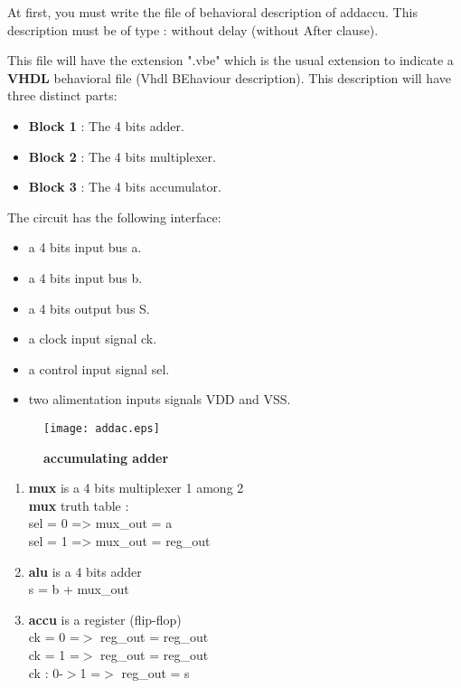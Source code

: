 \documentclass[12pt]{article}
\begin{document}
{At first, you must write the file of behavioral description of addaccu.
This description must be of type : without delay (without After clause).

This file will have the extension ".vbe" which is the usual extension
to indicate a {\bf VHDL} behavioral file (Vhdl BEhaviour description).
This description will have three distinct parts:

\begin{itemize}\itemsep=-.8ex
\item {\bf Block 1} : The 4 bits adder.
\item {\bf Block 2} : The 4 bits multiplexer.
\item {\bf Block 3} : The 4 bits accumulator.
\end{itemize}

The circuit has the following interface:

\begin{itemize}\itemsep=-.8ex
\item  a 4 bits input bus a.
\item  a 4 bits input bus b.
\item  a 4 bits output bus S.
\item  a clock input signal ck.
\item  a control input signal sel.
\item  two alimentation inputs signals VDD and VSS.
\end{itemize}


\begin{figure}[H]
  \center
  \texttt{[image: addac.eps]}
  \caption{\bf accumulating adder }
\end{figure}

\begin{enumerate}
\item {\bf mux } is a 4 bits multiplexer 1 among 2\\
    {\bf mux} truth table : \\
    sel = 0 => mux\_out = a \\
    sel = 1 => mux\_out = reg\_out \\
\item {\bf alu} is a 4 bits adder \\
    s = b + mux\_out \\
\item {\bf accu} is a register (flip-flop) \\
    ck = 0 =$>$ reg\_out = reg\_out \\
    ck = 1 =$>$ reg\_out = reg\_out \\
    ck : 0-$>$1 =$>$ reg\_out = s \\
\end{enumerate}

}
\end{document}

